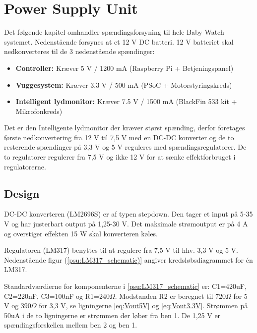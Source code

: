 \chapter{Power Supply Unit}

Det følgende kapitel omhandler spændingsforsyning til hele Baby Watch systemet. Nedenstående forsynes at et 12 V DC batteri. 12 V batteriet skal nedkonverteres til de 3 nedenstående spændinger: 
\begin{itemize}
\item \textbf{Controller:} Kræver 5 V / 1200 mA (Raspberry Pi + Betjeningspanel)

\item \textbf{Vuggesystem:} Kræver 3,3 V / 500 mA (PSoC + Motorstyringskreds)

\item \textbf{Intelligent lydmonitor:} Kræver 7.5 V / 1500 mA (BlackFin 533 kit + Mikrofonkreds)
\end{itemize}

Det er den Intelligente lydmonitor der kræver størst spænding, derfor foretages første nedkonvertering fra 12 V til 7,5 V med en DC-DC konverter og de to resterende spændinger på 3,3 V og 5 V reguleres med spændingsregulatorer. De to regulatorer regulerer fra 7,5 V og ikke 12 V for at sænke effektforbruget i regulatorerne. 

\section{Design}

DC-DC konverteren (LM2696S) er af typen stepdown. Den tager et input på 5-35 V og har justerbart output på 1,25-30 V. Det maksimale strømoutput er på 4 A og overstiger effekten 15 W skal konverteren køles. 

Regulatoren (LM317) benyttes til at regulere fra 7,5 V til hhv. 3,3 V og 5 V. Nedenstående figur (\ref{psu:LM317_schematic)} angiver kredsløbsdiagrammet for én LM317.


Standardværdierne for komponenterne i \ref{psu:LM317_schematic} er: C1=420uF, C2=220nF, C3=100nF og R1=240$\Omega$. Modstanden R2 er beregnet til $720\Omega$ for 5 V og $390\Omega$ for 3,3 V, se ligningerne \ref{eq:Vout5V} og \ref{eq:Vout3.3V}. Strømmen på 50uA i de to ligningerne er strømmen der løber fra ben 1. De 1,25 V er spændingsforskellen mellem ben 2 og ben 1. 

